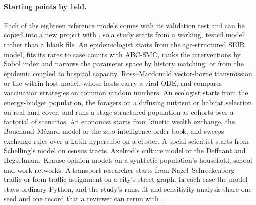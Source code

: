 \paragraph{Starting points by field.} Each of the eighteen reference models comes with its
validation test and can be copied into a new project with , so
a study starts from a working, tested model rather than a blank file. An epidemiologist starts
from the age-structured SEIR model, fits its rates to case counts with ABC-SMC, ranks the
interventions by Sobol index and narrows the parameter space by history matching; or from the
epidemic coupled to hospital capacity, Ross--Macdonald vector-borne transmission or the
within-host model, whose hosts carry a viral ODE, and compares vaccination strategies on common
random numbers. An
ecologist starts from the energy-budget population, the foragers on a diffusing nutrient or
habitat selection on real land cover, and runs a stage-structured population as cohorts over a
factorial of scenarios. An economist starts from kinetic wealth exchange, the Bouchaud--M\'ezard
model or the zero-intelligence order book, and sweeps exchange rules over a Latin hypercube on
a cluster. A social scientist starts from Schelling's model on census tracts, Axelrod's culture
model or the Deffuant and Hegselmann--Krause opinion models on a synthetic population's
household, school and work networks. A transport researcher starts from Nagel--Schreckenberg
traffic or from traffic assignment on a city's street graph. In each case the model stays
ordinary Python, and the study's runs, fit and sensitivity analysis share one seed and one
record that a reviewer can rerun with .
